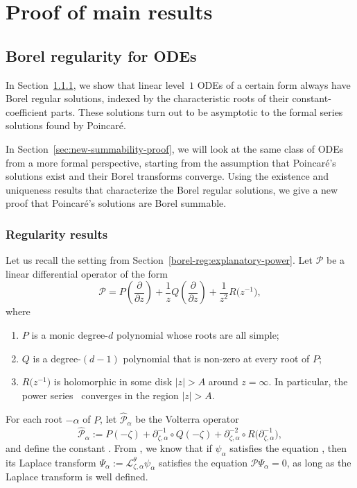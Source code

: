 \documentclass[10pt,a4paper]{amsart}
\newcommand{\laplace}{\mathcal{L}}
\numberwithin{equation}{section}
\begin{document}
\section{Proof of main results}\label{sec:proof_main_results}
\subsection{Borel regularity for ODEs}\label{borel_reg-ODE}
In Section~\ref{sec:regularity-results}, we show that linear level~$1$ ODEs of a certain form always have Borel regular solutions, indexed by the characteristic roots of their constant-coefficient parts. These solutions turn out to be asymptotic to the formal series solutions found by Poincar\'e.

In Section~\ref{sec:new-summability-proof}, we will look at the same class of ODEs from a more formal perspective, starting from the assumption that Poincar\'e's solutions exist and their Borel transforms converge. Using the existence and uniqueness results that characterize the Borel regular solutions, we give a new proof that Poincar\'e's solutions are Borel summable.
%
\subsubsection{Regularity results}\label{sec:regularity-results}
Let us recall the setting from Section~\ref{borel-reg:explanatory-power}. Let $\mathcal{P}$ be a linear differential operator of the form
\begin{equation}\label{eqn:operator-P}
\mathcal{P} = P\left(\frac{\partial}{\partial z}\right) + \frac{1}{z} Q\left(\frac{\partial}{\partial z}\right) + \frac{1}{z^2} R\bigl(z^{-1}\bigr),
\end{equation}
where
\begin{enumerate}\itemsep=0pt
\item[(1)] $P$ is a monic degree-$d$ polynomial whose roots are all simple;
\item[(2)] $Q$ is a degree-$(d-1)$ polynomial that is non-zero at every root of $P$;
\item[(3)] $R\bigl(z^{-1}\bigr)$ is holomorphic in some disk $|z| > A$ around $z = \infty$. In particular, the power series~
converges in the region $|z| > A$.
\end{enumerate}
For each root $-\alpha$ of $P$, let $\hat{\mathcal{P}}_{\alpha}$ be the Volterra operator
\begin{equation}\label{eq:hat_P}
\hat{\mathcal{P}}_\alpha:=P(-\zeta)+\partial_{\zeta,\alpha}^{-1}\circ Q(-\zeta)+\partial_{\zeta,\alpha}^{-2}\circ R\bigl(\partial_{\zeta,\alpha}^{-1}\bigr),
\end{equation}
and define the constant . From \cite[Lemma~4.3]{reg-sing-volterra}, we know that if $\psi_\alpha$ satisfies the equation , then its Laplace transform $\Psi_\alpha:=\laplace_{\zeta,\alpha}^{\theta}\psi_\alpha$ satisfies the equation $\mathcal{P}\Psi_\alpha=0$, as long as the Laplace transform is well defined.
\end{document}
